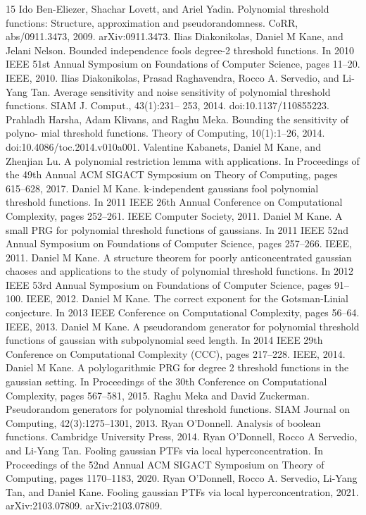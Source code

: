 \documentclass[10pt,a4paper]{article}
\begin{document}
\begin{thebibliography}{15}
 Ido Ben-Eliezer, Shachar Lovett, and Ariel Yadin. Polynomial threshold functions: Structure, approximation and pseudorandomness. CoRR, abs/0911.3473, 2009. arXiv:0911.3473.
 Ilias Diakonikolas, Daniel M Kane, and Jelani Nelson. Bounded independence fools degree-2 threshold functions. In 2010 IEEE 51st Annual Symposium on Foundations of Computer Science, pages 11–20. IEEE, 2010.
 Ilias Diakonikolas, Prasad Raghavendra, Rocco A. Servedio, and Li-Yang Tan. Average sensitivity and noise sensitivity of polynomial threshold functions. SIAM J. Comput., 43(1):231– 253, 2014. doi:10.1137/110855223.
 Prahladh Harsha, Adam Klivans, and Raghu Meka. Bounding the sensitivity of polyno- mial threshold functions. Theory of Computing, 10(1):1–26, 2014. doi:10.4086/toc.2014.v010a001.
 Valentine Kabanets, Daniel M Kane, and Zhenjian Lu. A polynomial restriction lemma with applications. In Proceedings of the 49th Annual ACM SIGACT Symposium on Theory of Computing, pages 615–628, 2017.
 Daniel M Kane. k-independent gaussians fool polynomial threshold functions. In 2011 IEEE 26th Annual Conference on Computational Complexity, pages 252–261. IEEE Computer Society, 2011.
 Daniel M Kane. A small PRG for polynomial threshold functions of gaussians. In 2011 IEEE 52nd Annual Symposium on Foundations of Computer Science, pages 257–266. IEEE, 2011.
 Daniel M Kane. A structure theorem for poorly anticoncentrated gaussian chaoses and applications to the study of polynomial threshold functions. In 2012 IEEE 53rd Annual Symposium on Foundations of Computer Science, pages 91–100. IEEE, 2012.
 Daniel M Kane. The correct exponent for the Gotsman-Linial conjecture. In 2013 IEEE Conference on Computational Complexity, pages 56–64. IEEE, 2013.
 Daniel M Kane. A pseudorandom generator for polynomial threshold functions of gaussian with subpolynomial seed length. In 2014 IEEE 29th Conference on Computational Complexity (CCC), pages 217–228. IEEE, 2014.
 Daniel M Kane. A polylogarithmic PRG for degree 2 threshold functions in the gaussian setting. In Proceedings of the 30th Conference on Computational Complexity, pages 567–581, 2015.
 Raghu Meka and David Zuckerman. Pseudorandom generators for polynomial threshold functions. SIAM Journal on Computing, 42(3):1275–1301, 2013.
 Ryan O’Donnell. Analysis of boolean functions. Cambridge University Press, 2014.
 Ryan O’Donnell, Rocco A Servedio, and Li-Yang Tan. Fooling gaussian PTFs via local hyperconcentration. In Proceedings of the 52nd Annual ACM SIGACT Symposium on Theory of Computing, pages 1170–1183, 2020.
 Ryan O’Donnell, Rocco A. Servedio, Li-Yang Tan, and Daniel Kane. Fooling gaussian PTFs via local hyperconcentration, 2021. arXiv:2103.07809. arXiv:2103.07809.
\end{thebibliography}
\end{document}
